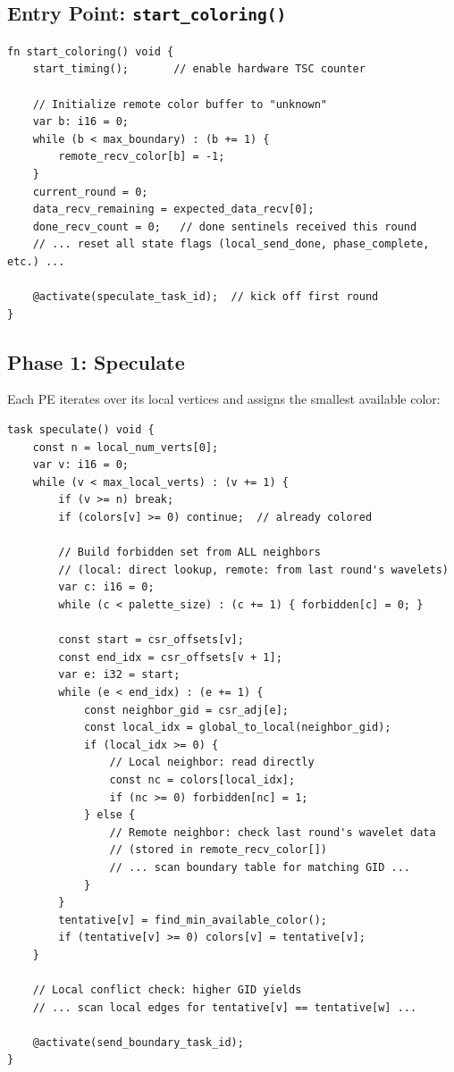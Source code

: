 \documentclass[11pt,letterpaper]{article}
\begin{document}
\subsection{Entry Point: \texttt{start\_coloring()}}

\begin{lstlisting}[language=CSL, caption={Entry point (from \texttt{pe\_program.csl})}, label=lst:entry]
fn start_coloring() void {
    start_timing();       // enable hardware TSC counter

    // Initialize remote color buffer to "unknown"
    var b: i16 = 0;
    while (b < max_boundary) : (b += 1) {
        remote_recv_color[b] = -1;
    }
    current_round = 0;
    data_recv_remaining = expected_data_recv[0];
    done_recv_count = 0;   // done sentinels received this round
    // ... reset all state flags (local_send_done, phase_complete, etc.) ...

    @activate(speculate_task_id);  // kick off first round
}
\end{lstlisting}

\subsection{Phase 1: Speculate}

Each PE iterates over its local vertices and assigns the smallest available color:

\begin{lstlisting}[language=CSL, caption={Speculate task (simplified from \texttt{pe\_program.csl})}, label=lst:spec]
task speculate() void {
    const n = local_num_verts[0];
    var v: i16 = 0;
    while (v < max_local_verts) : (v += 1) {
        if (v >= n) break;
        if (colors[v] >= 0) continue;  // already colored

        // Build forbidden set from ALL neighbors
        // (local: direct lookup, remote: from last round's wavelets)
        var c: i16 = 0;
        while (c < palette_size) : (c += 1) { forbidden[c] = 0; }

        const start = csr_offsets[v];
        const end_idx = csr_offsets[v + 1];
        var e: i32 = start;
        while (e < end_idx) : (e += 1) {
            const neighbor_gid = csr_adj[e];
            const local_idx = global_to_local(neighbor_gid);
            if (local_idx >= 0) {
                // Local neighbor: read directly
                const nc = colors[local_idx];
                if (nc >= 0) forbidden[nc] = 1;
            } else {
                // Remote neighbor: check last round's wavelet data
                // (stored in remote_recv_color[])
                // ... scan boundary table for matching GID ...
            }
        }
        tentative[v] = find_min_available_color();
        if (tentative[v] >= 0) colors[v] = tentative[v];
    }

    // Local conflict check: higher GID yields
    // ... scan local edges for tentative[v] == tentative[w] ...

    @activate(send_boundary_task_id);
}
\end{lstlisting}
\end{document}
